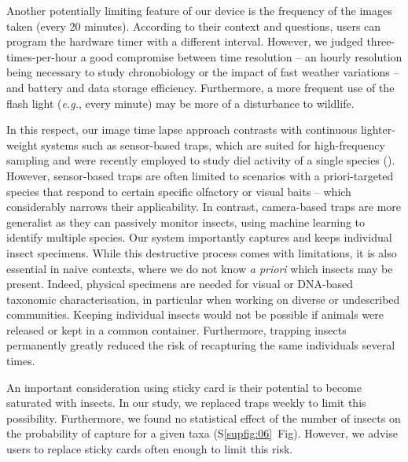 \documentclass[12pt]{article}
\begin{document}
\begin{linenumbers}
		
		Another potentially limiting feature of our device is the frequency of the images taken (every 20 minutes). 
		According to their context and questions, users can program the hardware timer with a different interval.
		However, we judged three-times-per-hour a good compromise between time resolution -- an hourly resolution being necessary to study chronobiology or the impact of fast weather variations -- and battery and data storage efficiency.
		Furthermore, a more frequent use of the flash light (\emph{e.g.}, every minute) may be more of a disturbance to wildlife\cite{longcore_ecological_2004}.		
		
		In this respect, our image time lapse approach contrasts with continuous lighter-weight systems such as sensor-based traps, which are suited for high-frequency sampling and were recently employed to study diel activity of a single species (\cite{chen_flying_2014, goldshtein_long-term_2021}).
		However, sensor-based traps are often limited to scenarios with a priori-targeted species that respond to certain specific olfactory or visual baits – which considerably narrows their applicability\cite{preti_insect_2020}.
		In contrast, camera-based traps are more generalist as they can passively monitor insects, using machine learning to identify multiple species. Our system importantly captures and keeps individual insect specimens. 
		While this destructive process comes with limitations, 
		it is also essential in naive contexts, where we do not know \emph{a priori} which insects may be present.
		Indeed, physical specimens are needed for visual or DNA-based taxonomic characterisation, in particular when working on diverse or undescribed communities\cite{turney_non-repeatable_2015}.
		Keeping individual insects would not be possible if animals were released or kept in a common container. 
		Furthermore, trapping insects permanently greatly reduced the risk of recapturing the same individuals several times.
		
		
		An important consideration using sticky card is their potential to become saturated with insects. 
		In our study, we replaced traps weekly to limit this possibility. 
		Furthermore, we found no statistical effect of the number of insects on the probability of capture for a given taxa
		(S\ref{supfig:06}~Fig). However, we advise users to replace sticky cards often enough to limit this risk.
		
					
		

\end{linenumbers}
\end{document}
